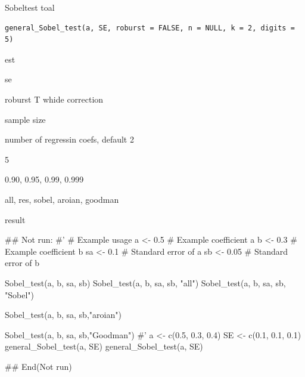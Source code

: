 \documentclass[a4paper]{book}
\begin{document}
%
\begin{Description}
Sobeltest toal
\end{Description}
%
\begin{Usage}
\begin{verbatim}
general_Sobel_test(a, SE, roburst = FALSE, n = NULL, k = 2, digits = 5)
\end{verbatim}
\end{Usage}
%
\begin{Arguments}
\begin{ldescription}
\item[\code{a}] est

\item[\code{SE}] se

\item[\code{roburst}] roburst T whide correction

\item[\code{n}] sample size

\item[\code{k}] number of regressin coefs, default 2

\item[\code{digits}] 5

\item[\code{conf}] 0.90, 0.95, 0.99, 0.999

\item[\code{type}] all, res, sobel, aroian, goodman
\end{ldescription}
\end{Arguments}
%
\begin{Value}
result
\end{Value}
%
\begin{Examples}
\begin{ExampleCode}

\#\# Not run: 
#'
# Example usage
a <- 0.5  # Example coefficient a
b <- 0.3  # Example coefficient b
sa <- 0.1 # Standard error of a
sb <- 0.05 # Standard error of b

Sobel_test(a, b, sa, sb)
Sobel_test(a, b, sa, sb, "all")
Sobel_test(a, b, sa, sb, "Sobel")

Sobel_test(a, b, sa, sb,"aroian")

Sobel_test(a, b, sa, sb,"Goodman")
#'
a <- c(0.5, 0.3, 0.4)
SE <- c(0.1, 0.1, 0.1)
general_Sobel_test(a, SE)
general_Sobel_test(a, SE)%



## End(Not run)
\end{ExampleCode}
\end{Examples}
\end{document}
